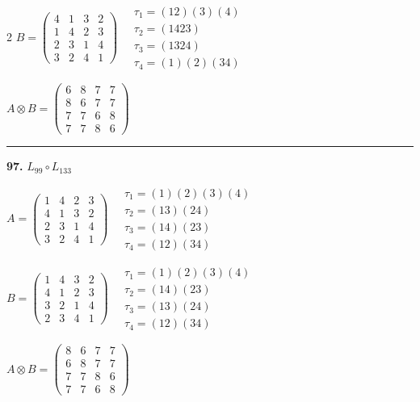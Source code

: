\begin{multicols}{2}
$B = \begin{pmatrix} 4 & 1 & 3 & 2 \\ 1 & 4 & 2 & 3 \\ 2 & 3 & 1 & 4 \\ 3 & 2 & 4 & 1 \end{pmatrix} \quad \begin{matrix} \tau_{1}=(1 2)(3)(4) \\ \tau_{2}=(1 4 2 3) \\ \tau_{3}=(1 3 2 4) \\ \tau_{4}=(1)(2)(3 4) \end{matrix}$

$A \otimes B = \begin{pmatrix} 6 & 8 & 7 & 7 \\ 8 & 6 & 7 & 7 \\ 7 & 7 & 6 & 8 \\ 7 & 7 & 8 & 6 \end{pmatrix}$

\vspace{0.3em}
\hrule
\vspace{0.3em}

\noindent\textbf{97.} $L_{99} \circ L_{133}$

$A = \begin{pmatrix} 1 & 4 & 2 & 3 \\ 4 & 1 & 3 & 2 \\ 2 & 3 & 1 & 4 \\ 3 & 2 & 4 & 1 \end{pmatrix} \quad \begin{matrix} \tau_{1}=(1)(2)(3)(4) \\ \tau_{2}=(1 3)(2 4) \\ \tau_{3}=(1 4)(2 3) \\ \tau_{4}=(1 2)(3 4) \end{matrix}$

$B = \begin{pmatrix} 1 & 4 & 3 & 2 \\ 4 & 1 & 2 & 3 \\ 3 & 2 & 1 & 4 \\ 2 & 3 & 4 & 1 \end{pmatrix} \quad \begin{matrix} \tau_{1}=(1)(2)(3)(4) \\ \tau_{2}=(1 4)(2 3) \\ \tau_{3}=(1 3)(2 4) \\ \tau_{4}=(1 2)(3 4) \end{matrix}$

$A \otimes B = \begin{pmatrix} 8 & 6 & 7 & 7 \\ 6 & 8 & 7 & 7 \\ 7 & 7 & 8 & 6 \\ 7 & 7 & 6 & 8 \end{pmatrix}$


\end{multicols}
